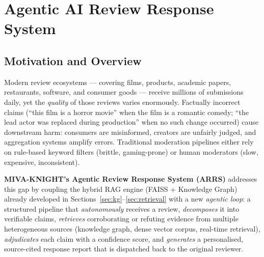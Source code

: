 \documentclass[12pt,a4paper]{article}
\theoremstyle{definition}
\theoremstyle{plain}
\theoremstyle{remark}
\begin{document}
\newpage
\section{Agentic AI Review Response System}
\label{sec:agentic_review}

\subsection{Motivation and Overview}

Modern review ecosystems — covering films, products, academic papers, restaurants, 
software, and consumer goods — receive millions of submissions daily, yet the 
\emph{quality} of those reviews varies enormously. Factually incorrect claims 
(``this film is a horror movie'' when the film is a romantic comedy; 
``the lead actor was replaced during production'' when no such change occurred) 
cause downstream harm: consumers are misinformed, creators are unfairly judged, 
and aggregation systems amplify errors. Traditional moderation pipelines either 
rely on rule-based keyword filters (brittle, gaming-prone) or human moderators 
(slow, expensive, inconsistent).

\textbf{MIVA-KNIGHT's Agentic Review Response System (ARRS)} addresses this 
gap by coupling the hybrid RAG engine (FAISS + Knowledge Graph) already 
developed in Sections~\ref{sec:kg}--\ref{sec:retrieval} with a new 
\emph{agentic loop}: a structured pipeline that \emph{autonomously} receives 
a review, \emph{decomposes} it into verifiable claims, \emph{retrieves} 
corroborating or refuting evidence from multiple heterogeneous sources 
(knowledge graph, dense vector corpus, real-time retrieval), \emph{adjudicates} 
each claim with a confidence score, and \emph{generates} a personalised, 
source-cited response report that is dispatched back to the original reviewer.
\end{document}
